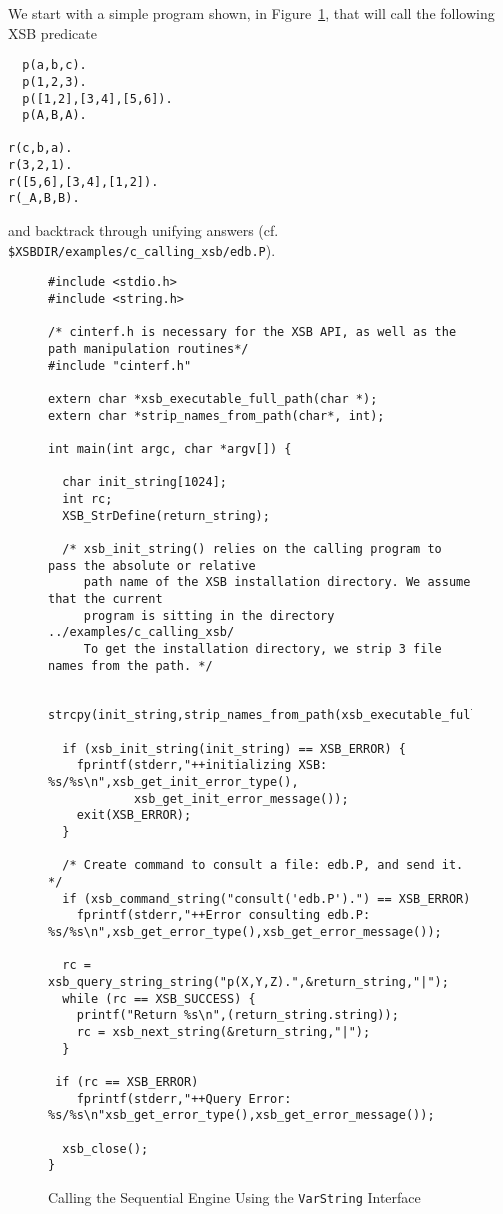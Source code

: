 We start with a simple program shown, in Figure~\ref{fig:varstringex},
that will call the following XSB predicate
%
\begin{small}
\begin{verbatim}
  p(a,b,c).
  p(1,2,3).
  p([1,2],[3,4],[5,6]).
  p(A,B,A).

r(c,b,a).
r(3,2,1).
r([5,6],[3,4],[1,2]).
r(_A,B,B).

\end{verbatim}
\end{small}
%
and backtrack through unifying answers (cf. {\tt
  \$XSBDIR/examples/c\_calling\_xsb/edb.P}).
%
\begin{figure}[hbtp]
\begin{small}
\begin{verbatim}
#include <stdio.h>
#include <string.h>

/* cinterf.h is necessary for the XSB API, as well as the path manipulation routines*/
#include "cinterf.h"

extern char *xsb_executable_full_path(char *);
extern char *strip_names_from_path(char*, int);

int main(int argc, char *argv[]) { 

  char init_string[1024];
  int rc;
  XSB_StrDefine(return_string);

  /* xsb_init_string() relies on the calling program to pass the absolute or relative
     path name of the XSB installation directory. We assume that the current
     program is sitting in the directory ../examples/c_calling_xsb/
     To get the installation directory, we strip 3 file names from the path. */

  strcpy(init_string,strip_names_from_path(xsb_executable_full_path(argv[0]),3));

  if (xsb_init_string(init_string) == XSB_ERROR) {
    fprintf(stderr,"++initializing XSB: %s/%s\n",xsb_get_init_error_type(),
            xsb_get_init_error_message());
    exit(XSB_ERROR);
  }

  /* Create command to consult a file: edb.P, and send it. */
  if (xsb_command_string("consult('edb.P').") == XSB_ERROR)
    fprintf(stderr,"++Error consulting edb.P: %s/%s\n",xsb_get_error_type(),xsb_get_error_message());

  rc = xsb_query_string_string("p(X,Y,Z).",&return_string,"|");
  while (rc == XSB_SUCCESS) {
    printf("Return %s\n",(return_string.string));
    rc = xsb_next_string(&return_string,"|");
  }
 
 if (rc == XSB_ERROR) 
    fprintf(stderr,"++Query Error: %s/%s\n"xsb_get_error_type(),xsb_get_error_message());

  xsb_close();     
}
\end{verbatim}
\end{small}
\caption{Calling the Sequential Engine Using the {\tt VarString} Interface} \label{fig:varstringex}
\end{figure}


